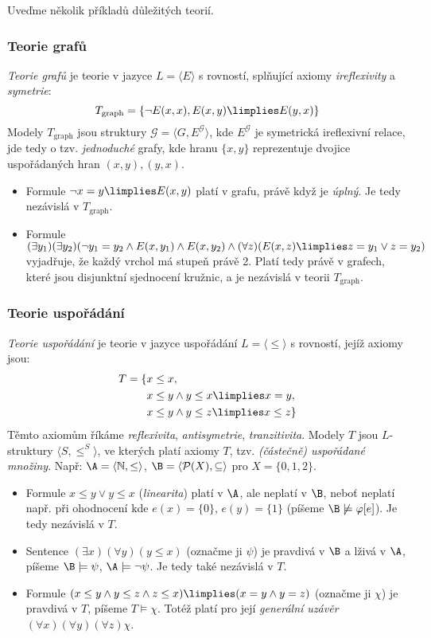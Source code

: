 Uveďme několik příkladů důležitých teorií.

\subsubsection{Teorie grafů}
\emph{Teorie grafů} je teorie v jazyce $L=\langle E\rangle$ s rovností, splňující axiomy \emph{ireflexivity} a \emph{symetrie}:
$$
T_\text{graph}=\{\neg E(x, x),E(x,y)\limplies E(y,x)\}
$$
Modely $T_\text{graph}$ jsou struktury $\mathcal G=\langle G,E^\mathcal G\rangle$, kde $E^\mathcal G$ je symetrická ireflexivní relace, jde tedy o tzv. \emph{jednoduché} grafy, kde hranu $\{x,y\}$ reprezentuje dvojice uspořádaných hran $(x,y),(y,x)$.
\begin{itemize}
    \item Formule $\neg x=y\limplies E(x,y)$ platí v grafu, právě když je \emph{úplný}. Je tedy nezávislá v $T_\text{graph}$.
    \item Formule $(\exists y_1)(\exists y_2)(\neg y_1=y_2\land E(x,y_1)\land E(x,y_2)\land (\forall z)(E(x,z)\limplies z=y_1\lor z=y_2)$ vyjadřuje, že každý vrchol má stupeň právě 2. Platí tedy právě v grafech, které jsou disjunktní sjednocení kružnic, a je nezávislá v teorii $T_\text{graph}$.
\end{itemize}


\subsubsection{Teorie uspořádání}

\emph{Teorie uspořádání} je teorie v jazyce uspořádání $L=\langle\leq\rangle$ s rovností, jejíž axiomy jsou:
\begin{align*}
    T=\{& x\leq x,\\
        & x\leq y\land y\leq x\limplies x=y,\\
        & x\leq y\land y\leq z\limplies x\leq z\}\\
\end{align*}
Těmto axiomům říkáme \emph{reflexivita}, \emph{antisymetrie}, \emph{tranzitivita}. Modely $T$ jsou $L$-struktury $\langle S,\leq^S\rangle$, ve kterých platí axiomy $T$, tzv. \emph{(částečně) uspořádané množiny}. Např: $\A=\langle\mathbb N,\leq\rangle$, $\B=\langle\mathcal P(X),\subseteq\rangle$ pro $X=\{0,1,2\}$.
\begin{itemize}
    \item Formule $x\leq y\lor y\leq x$ (\emph{linearita}) platí v $\A$, ale neplatí v $\B$, neboť neplatí např. při ohodnocení kde $e(x)=\{0\}$, $e(y)=\{1\}$ (píšeme $\B\not\models\varphi[e]$). Je tedy nezávislá v $T$.
    \item Sentence $(\exists x)(\forall y)(y\leq x)$ (označme ji $\psi$) je pravdivá v $\B$ a lživá v $\A$, píšeme $\B\models\psi$, $\A\models\neg\psi$. Je tedy také nezávislá v $T$.
    \item Formule $(x\leq y\land y\leq z\land z\leq x)\limplies (x=y\land y=z)$ (označme ji $\chi$) je pravdivá v $T$, píšeme $T\models\chi$. Totéž platí pro její \emph{generální uzávěr} $(\forall x)(\forall y)(\forall z)\chi$.
\end{itemize}

